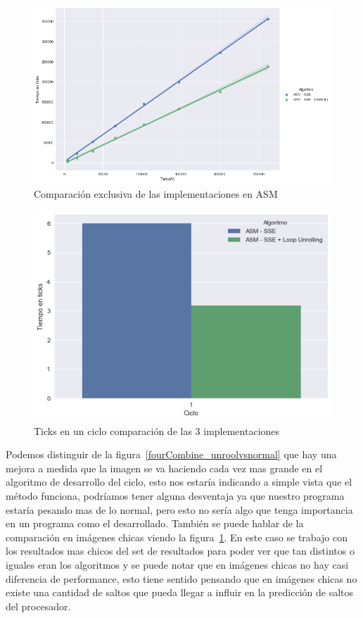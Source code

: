 \begin{figure}[H]
	\centering
	\includegraphics[scale=0.5]{img/fourCombine_UnrollvsNormal_asmOnly.png}
	\caption{Comparación exclusiva de las implementaciones en ASM}
	\label{fourCombine_unroolvsnormal_asmOnly}
\end{figure}

\begin{figure}[H]
	\centering
	\includegraphics[scale=0.5]{img/fourCombine_ticks_en_ciclo.png}
	\caption{Ticks en un ciclo comparación de las 3 implementaciones}
	\label{fourCombine_ticksciclo}
\end{figure}

Podemos distinguir de la figura~\ref{fourCombine_unroolvsnormal} que hay una mejora a medida que la imagen se va haciendo cada vez mas grande en el algoritmo de desarrollo del ciclo, esto nos estaría indicando a simple vista que el método funciona, podríamos tener alguna desventaja ya que nuestro programa estaría pesando mas de lo normal, pero esto no sería algo que tenga importancia en un programa como el desarrollado. También se puede hablar de la comparación en imágenes chicas viendo la figura~\ref{fourCombine_unroolvsnormal_asmOnly}. En este caso se trabajo con los resultados mas chicos del set de resultados para poder ver que tan distintos o iguales eran los algoritmos y se puede notar que en imágenes chicas no hay casi diferencia de performance, esto tiene sentido pensando que en imágenes chicas no existe una cantidad de saltos que pueda llegar a influir en la predicción de saltos del procesador.

